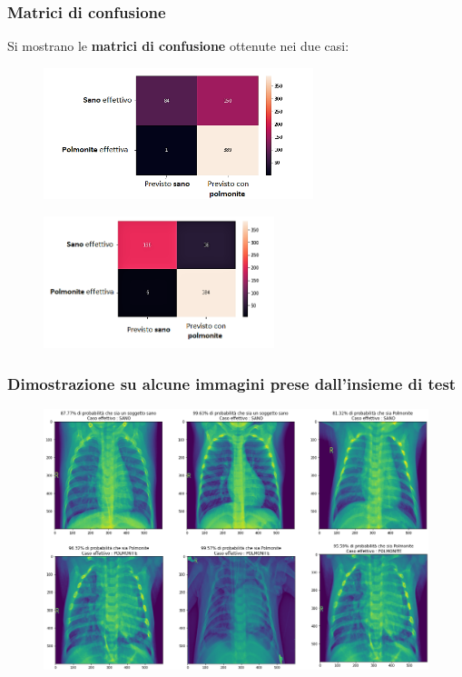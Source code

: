 \documentclass{beamer}
\begin{document}
\begin{frame}
	\frametitle{Matrici di confusione}
	Si mostrano le \textbf{matrici di confusione} ottenute nei due casi:
	\medskip
	\begin{figure}
		\includegraphics[width=0.7\textwidth]{conf-matrix-no-aug.png}
	\end{figure}

\begin{figure}
	\includegraphics[width=0.6\textwidth]{conf-matrix-pneumonia-aug.png}
\end{figure}	
\end{frame}



\begin{frame}
	\frametitle{Dimostrazione su alcune immagini prese dall'insieme di test}
	
	\begin{figure}
		\includegraphics[width=1\textwidth]{pneumonia results.png}
	\end{figure}

\end{frame}
\end{document}
